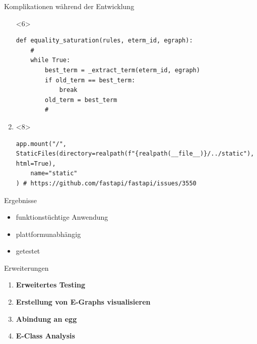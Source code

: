 \begin{frame}[fragile]{Komplikationen während der Entwicklung}
\begin{enumerate}
\begin{onlyenv}<6>
    \vspace{3mm}
    \begin{center}
\begin{verbatim}    
def equality_saturation(rules, eterm_id, egraph):
    #
    while True:
        best_term = _extract_term(eterm_id, egraph)
        if old_term == best_term:
            break
        old_term = best_term
        #  
\end{verbatim}
\end{center}
\end{onlyenv}
        
        \item {}
        
\begin{onlyenv}<8>
    \vspace{3mm}
    \begin{center}
\begin{verbatim}    
app.mount("/", 
StaticFiles(directory=realpath(f"{realpath(__file__)}/../static"), html=True),
    name="static"
) # https://github.com/fastapi/fastapi/issues/3550
\end{verbatim}
\end{center}
\end{onlyenv}

    \end{enumerate}
\end{frame}

\begin{frame}{Ergebnisse}
    \begin{itemize}
        \item funktionstüchtige Anwendung
        \item plattformunabhängig
        \item getestet
    \end{itemize}
\end{frame}

\begin{frame}{Erweiterungen}
    \begin{enumerate}
        \item \textbf{Erweitertes Testing}
        \item \textbf{Erstellung von E-Graphs visualisieren}
        \item \textbf{Abindung an egg}
        \item \textbf{E-Class Analysis}
    \end{enumerate}
\end{frame}